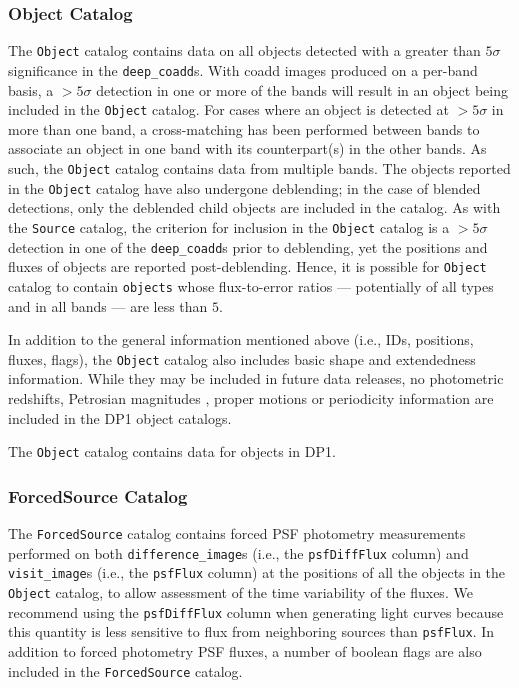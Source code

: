 \subsubsection{Object Catalog}
The \texttt{Object} catalog \citep{10.71929/rubin/2570325} contains data on all objects detected with a greater than $5\sigma$ significance in the \texttt{deep\_coadd}s.
With coadd images produced on a per-band basis, a $>5\sigma$ detection in one or more of the bands will result in an object being included in the \texttt{Object} catalog.
For cases where an object is detected at $>5\sigma$ in more than one band, a cross-matching has been performed between bands to associate an object in one band with its counterpart(s) in the other bands.
As such, the \texttt{Object} catalog contains data from multiple bands.
The objects reported in the \texttt{Object} catalog have also undergone deblending; in the case of blended detections, only the deblended child objects are included in the catalog.
As with the \texttt{Source} catalog, the criterion for inclusion in the \texttt{Object} catalog is a $>5\sigma$ detection in one of the \texttt{deep\_coadd}s prior to deblending, yet the positions and fluxes of objects are reported post-deblending.
Hence, it is possible for \texttt{Object} catalog to contain \texttt{objects} whose \gls{flux}-to-error ratios --- potentially of all types and in all bands --- are less than $5$.

In addition to the general information mentioned above (i.e., IDs, positions, fluxes, flags), the \texttt{Object} catalog also includes basic \gls{shape} and extendedness information.
While they may be included in future data releases, no photometric redshifts, Petrosian magnitudes \citep{1976ApJ...209L...1P}, proper motions or periodicity information are included in the \gls{DP1} object catalogs.

The \texttt{Object} catalog contains data for \nobjects objects in \gls{DP1}.

\subsubsection{ForcedSource Catalog}
The \texttt{ForcedSource} catalog \citep{10.71929/rubin/2570327} contains forced \gls{PSF} photometry measurements performed on both \texttt{difference\_image}s (i.e., the \texttt{psfDiffFlux} column) and \texttt{visit\_image}s (i.e., the \texttt{psfFlux} column) at the positions of all the objects in the \texttt{Object} catalog, to allow assessment of the time variability of the fluxes.
We recommend using the \texttt{psfDiffFlux} column when generating light curves because this quantity is less sensitive to \gls{flux} from neighboring sources than \texttt{psfFlux}.
In addition to \gls{forced photometry} \gls{PSF} fluxes, a number of boolean flags are also included in the \texttt{ForcedSource} catalog.

